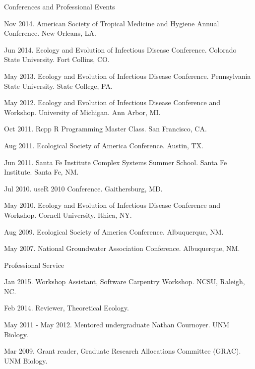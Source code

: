 \documentclass{resume} %
\begin{document}
\clearpage

\begin{rSection}{Conferences and Professional Events}
\item Nov 2014. American Society of Tropical Medicine and Hygiene Annual
Conference.  New Orleans, LA.
\item Jun 2014. Ecology and Evolution of Infectious Disease Conference.
Colorado State University.  Fort Collins, CO.
\item May 2013. Ecology and Evolution of Infectious Disease Conference.
Pennsylvania State University.  State College, PA.
\item May 2012. Ecology and Evolution of Infectious Disease Conference
and Workshop.  University of Michigan.  Ann Arbor, MI.
\item Oct 2011. Rcpp R Programming Master Class. San Francisco, CA.
\item Aug 2011. Ecological Society of America Conference. Austin, TX.
\item Jun 2011. Santa Fe Institute Complex Systems Summer School. Santa Fe Institute. Santa Fe, NM. 
\item Jul 2010.  useR 2010 Conference. Gaithersburg, MD. 
\item May 2010. Ecology and Evolution of Infectious Disease Conference
and Workshop.  Cornell University.  Ithica, NY.
\item Aug 2009. Ecological Society of America Conference. Albuquerque, NM.
\item May 2007. National Groundwater Association Conference. Albuquerque, NM. 
\end{rSection}

\begin{rSection}{Professional Service}
\item Jan 2015.  Workshop Assistant, Software Carpentry Workshop. NCSU, Raleigh, NC.
\item Feb 2014.  Reviewer, Theoretical Ecology.
\item May 2011 - May 2012. Mentored undergraduate Nathan Cournoyer. UNM Biology.
\item Mar 2009. Grant reader, Graduate Research Allocations Committee (GRAC). UNM Biology.
\end{rSection}
\end{document}
